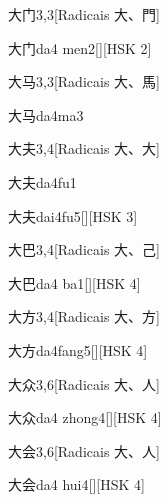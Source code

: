 \begin{entry}{大门}{3,3}[Radicais ⼤、⾨]
  \begin{phonetics}{大门}{da4 men2}[][HSK 2]
  \end{phonetics}
\end{entry}

\begin{entry}{大马}{3,3}[Radicais ⼤、⾺]
  \begin{phonetics}{大马}{da4ma3}
  \end{phonetics}
\end{entry}

\begin{entry}{大夫}{3,4}[Radicais ⼤、⼤]
  \begin{phonetics}{大夫}{da4fu1}
  \end{phonetics}
  \begin{phonetics}{大夫}{dai4fu5}[][HSK 3]
  \end{phonetics}
\end{entry}

\begin{entry}{大巴}{3,4}[Radicais ⼤、⼰]
  \begin{phonetics}{大巴}{da4 ba1}[][HSK 4]
  \end{phonetics}
\end{entry}

\begin{entry}{大方}{3,4}[Radicais ⼤、⽅]
  \begin{phonetics}{大方}{da4fang5}[][HSK 4]
  \end{phonetics}
\end{entry}

\begin{entry}{大众}{3,6}[Radicais ⼤、⼈]
  \begin{phonetics}{大众}{da4 zhong4}[][HSK 4]
  \end{phonetics}
\end{entry}

\begin{entry}{大会}{3,6}[Radicais ⼤、⼈]
  \begin{phonetics}{大会}{da4 hui4}[][HSK 4]
  \end{phonetics}
\end{entry}

